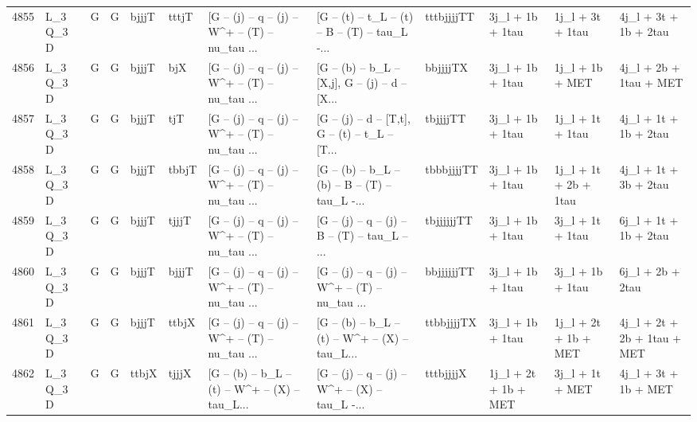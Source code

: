 \begin{tabular}{llllllllllll}
4855 &    L\_3 Q\_3 D &     G &     G &       bjjjT &       tttjT &  [G -- (j) -- q -- (j) -- W\textasciicircum + -- (T) -- nu\_tau ... &  [G -- (t) -- t\_L -- (t) -- B -- (T) -- tau\_L -... &  tttbjjjjTT &         3j\_l + 1b + 1tau &         1j\_l + 3t + 1tau &              4j\_l + 3t + 1b + 2tau \\
4856 &    L\_3 Q\_3 D &     G &     G &       bjjjT &         bjX &  [G -- (j) -- q -- (j) -- W\textasciicircum + -- (T) -- nu\_tau ... &  [G -- (b) -- b\_L -- [X,j], G -- (j) -- d -- [X... &    bbjjjjTX &         3j\_l + 1b + 1tau &          1j\_l + 1b + MET &             4j\_l + 2b + 1tau + MET \\
4857 &    L\_3 Q\_3 D &     G &     G &       bjjjT &         tjT &  [G -- (j) -- q -- (j) -- W\textasciicircum + -- (T) -- nu\_tau ... &  [G -- (j) -- d -- [T,t], G -- (t) -- t\_L -- [T... &    tbjjjjTT &         3j\_l + 1b + 1tau &         1j\_l + 1t + 1tau &              4j\_l + 1t + 1b + 2tau \\
4858 &    L\_3 Q\_3 D &     G &     G &       bjjjT &       tbbjT &  [G -- (j) -- q -- (j) -- W\textasciicircum + -- (T) -- nu\_tau ... &  [G -- (b) -- b\_L -- (b) -- B -- (T) -- tau\_L -... &  tbbbjjjjTT &         3j\_l + 1b + 1tau &    1j\_l + 1t + 2b + 1tau &              4j\_l + 1t + 3b + 2tau \\
4859 &    L\_3 Q\_3 D &     G &     G &       bjjjT &       tjjjT &  [G -- (j) -- q -- (j) -- W\textasciicircum + -- (T) -- nu\_tau ... &  [G -- (j) -- q -- (j) -- B -- (T) -- tau\_L -- ... &  tbjjjjjjTT &         3j\_l + 1b + 1tau &         3j\_l + 1t + 1tau &              6j\_l + 1t + 1b + 2tau \\
4860 &    L\_3 Q\_3 D &     G &     G &       bjjjT &       bjjjT &  [G -- (j) -- q -- (j) -- W\textasciicircum + -- (T) -- nu\_tau ... &  [G -- (j) -- q -- (j) -- W\textasciicircum + -- (T) -- nu\_tau ... &  bbjjjjjjTT &         3j\_l + 1b + 1tau &         3j\_l + 1b + 1tau &                   6j\_l + 2b + 2tau \\
4861 &    L\_3 Q\_3 D &     G &     G &       bjjjT &       ttbjX &  [G -- (j) -- q -- (j) -- W\textasciicircum + -- (T) -- nu\_tau ... &  [G -- (b) -- b\_L -- (t) -- W\textasciicircum + -- (X) -- tau\_L... &  ttbbjjjjTX &         3j\_l + 1b + 1tau &     1j\_l + 2t + 1b + MET &        4j\_l + 2t + 2b + 1tau + MET \\
4862 &    L\_3 Q\_3 D &     G &     G &       ttbjX &       tjjjX &  [G -- (b) -- b\_L -- (t) -- W\textasciicircum + -- (X) -- tau\_L... &  [G -- (j) -- q -- (j) -- W\textasciicircum + -- (X) -- tau\_L -... &   tttbjjjjX &     1j\_l + 2t + 1b + MET &          3j\_l + 1t + MET &               4j\_l + 3t + 1b + MET \\

\end{tabular}
